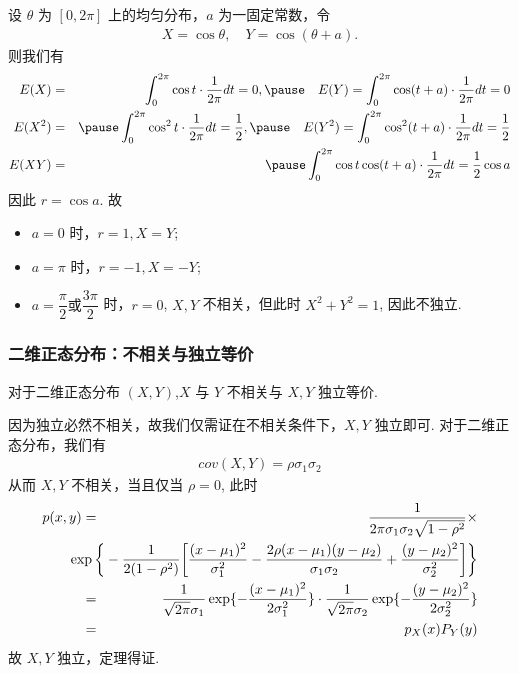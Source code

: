 \begin{frame}
	\vspace{0.3cm}
	\begin{exam}
		设 $\theta$ 为 $[0,2\pi]$ 上的均匀分布，$a$ 为一固定常数，令
		\begin{eqnarray*}
			X=\cos \theta, \quad Y=\cos (\theta+a).
		\end{eqnarray*}
		则我们有 \pause
		\begin{eqnarray*}
			E(X)&=&\int_0^{2\pi}\cos t \cdot \dfrac{1}{2\pi}dt=0,\pause \quad  E(Y)=\int_0^{2\pi}\cos (t+a) \cdot \dfrac{1}{2\pi}dt=0\\
			E(X^2)&=&\pause \int_0^{2\pi}\cos^2 t \cdot \dfrac{1}{2\pi}dt=\dfrac{1}{2},\pause \quad E(Y^2)=\int_0^{2\pi}\cos^2 (t+a) \cdot \dfrac{1}{2\pi}dt=\dfrac{1}{2}\\
			E(XY)&=&\pause \int_0^{2\pi}\cos t \cos(t+a) \cdot \dfrac{1}{2\pi}dt=\dfrac{1}{2}\cos a
		\end{eqnarray*}
		\pause 因此 $r=\cos a$. 故
		\begin{itemize}[<+-|alert@+>]
			\item $a=0$ 时，$r=1, X=Y$;
			\item $a=\pi$ 时，$r=-1, X=-Y$;
			\item $a=\dfrac{\pi}{2}\mbox{或}\dfrac{3\pi}{2}$ 时，$r=0$, $X,Y$ 不相关，但此时 $X^2+Y^2=1$, 因此不独立.
		\end{itemize}

	\end{exam}
\end{frame}

\begin{frame}
	\frametitle{二维正态分布：不相关与独立等价}
	\begin{thm}
		对于二维正态分布 $(X,Y)$,$X$ 与 $Y$ 不相关与 $X,Y$ 独立等价.
	\end{thm}

	\pause \zheng 因为独立必然不相关，故我们仅需证在不相关条件下，$X,Y$ 独立即可. \pause 对于二维正态分布，我们有
	\begin{eqnarray*}
		cov(X,Y)=\rho\sigma_1\sigma_2
	\end{eqnarray*}
	\pause 从而 $X,Y$ 不相关，当且仅当 $\rho=0$, 此时
	\begin{eqnarray*}
		p(x,y)&=&\dfrac{1}{2\pi \sigma_1\sigma_2\sqrt{1-\rho^2}}\times\\
		&&\hspace{-1cm}\exp\bigg\{-\dfrac{1}{2(1-\rho^2)}\bigg[\dfrac{(x-\mu_1)^2}{\sigma_1^2}-\dfrac{2\rho(x-\mu_1)(y-\mu_2)}{\sigma_1\sigma_2}+\dfrac{(y-\mu_2)^2}{\sigma_2^2}\bigg]\bigg\}\\
		&=&\dfrac{1}{\sqrt{2\pi}\sigma_1}\exp\{-\dfrac{(x-\mu_1)^2}{2\sigma_1^2}\}\cdot \dfrac{1}{\sqrt{2\pi}\sigma_2}\exp\{-\dfrac{(y-\mu_2)^2}{2\sigma_2^2}\}\\
		&=&p_X(x)P_Y(y)
	\end{eqnarray*}
	故 $X,Y$ 独立，定理得证.


\end{frame}

